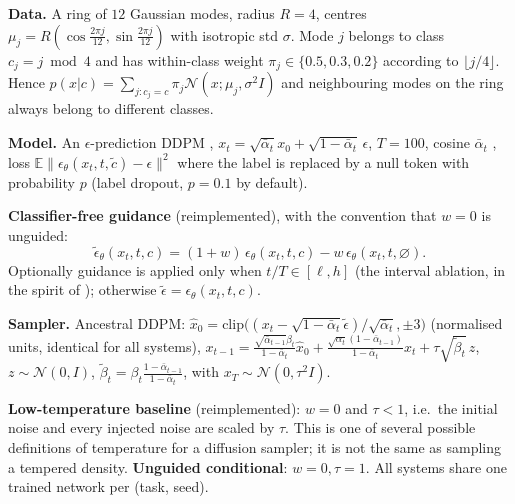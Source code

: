 \textbf{Data.} A ring of $12$ Gaussian modes, radius $R=4$, centres $\mu_j=R(\cos\frac{2\pi j}{12},\sin\frac{2\pi j}{12})$ with isotropic std $\sigma$. Mode $j$ belongs to class $c_j=j \bmod 4$ and has within-class weight $\pi_j\in\{0.5,0.3,0.2\}$ according to $\lfloor j/4\rfloor$. Hence $p(x|c)=\sum_{j:c_j=c}\pi_j\mathcal N(x;\mu_j,\sigma^2I)$ and neighbouring modes on the ring always belong to different classes.

\textbf{Model.} An $\epsilon$-prediction DDPM \cite{ho2020denoising}, $x_t=\sqrt{\bar\alpha_t}x_0+\sqrt{1-\bar\alpha_t}\,\epsilon$, $T=100$, cosine $\bar\alpha_t$ \cite{nichol2021improved}, loss $\mathbb E\|\epsilon_\theta(x_t,t,\tilde c)-\epsilon\|^2$ where the label is replaced by a null token with probability $p$ (label dropout, $p=0.1$ by default).

\textbf{Classifier-free guidance} \cite{ho2022classifier} (reimplemented), with the convention that $w=0$ is unguided:
\begin{equation}
\tilde\epsilon_\theta(x_t,t,c)=(1+w)\,\epsilon_\theta(x_t,t,c)-w\,\epsilon_\theta(x_t,t,\varnothing).
\end{equation}
Optionally guidance is applied only when $t/T\in[\ell,h]$ (the interval ablation, in the spirit of \cite{kynknniemi2024applying}); otherwise $\tilde\epsilon=\epsilon_\theta(x_t,t,c)$.

\textbf{Sampler.} Ancestral DDPM: $\hat x_0=\mathrm{clip}\big((x_t-\sqrt{1-\bar\alpha_t}\tilde\epsilon)/\sqrt{\bar\alpha_t},\pm3\big)$ (normalised units, identical for all systems), 
$x_{t-1}=\tfrac{\sqrt{\bar\alpha_{t-1}}\beta_t}{1-\bar\alpha_t}\hat x_0+\tfrac{\sqrt{\alpha_t}(1-\bar\alpha_{t-1})}{1-\bar\alpha_t}x_t+\tau\sqrt{\tilde\beta_t}\,z$, $z\sim\mathcal N(0,I)$, $\tilde\beta_t=\beta_t\frac{1-\bar\alpha_{t-1}}{1-\bar\alpha_t}$, with $x_T\sim\mathcal N(0,\tau^2I)$.

\textbf{Low-temperature baseline} (reimplemented): $w=0$ and $\tau<1$, i.e.\ the initial noise and every injected noise are scaled by $\tau$. This is one of several possible definitions of temperature for a diffusion sampler; it is not the same as sampling a tempered density. \textbf{Unguided conditional}: $w=0,\tau=1$. All systems share one trained network per (task, seed).


